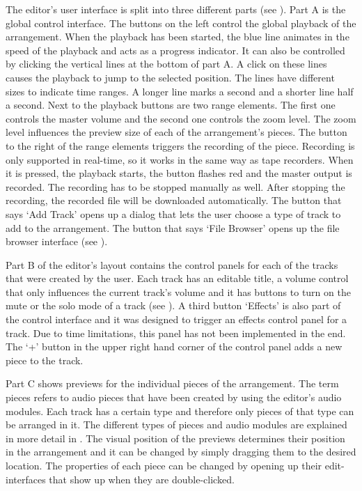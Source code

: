 The editor's user interface is split into three different parts (see ). Part A is the global control interface. The buttons on the left control the global playback of the arrangement. When the playback has been started, the blue line animates in the speed of the playback and acts as a progress indicator. It can also be controlled by clicking the vertical lines at the bottom of part A. A click on these lines causes the playback to jump to the selected position. The lines have different sizes to indicate time ranges. A longer line marks a second and a shorter line half a second. Next to the playback buttons are two range elements. The first one controls the master volume and the second one controls the zoom level. The zoom level influences the preview size of each of the arrangement's pieces. The button to the right of the range elements triggers the recording of the piece. Recording is only supported in real-time, so it works in the same way as tape recorders. When it is pressed, the playback starts, the button flashes red and the master output is recorded. The recording has to be stopped manually as well. After stopping the recording, the recorded file will be downloaded automatically. The button that says `Add Track' opens up a dialog that lets the user choose a type of track to add to the arrangement. The button that says `File Browser' opens up the file browser interface (see ).

Part B of the editor's layout contains the control panels for each of the tracks that were created by the user. Each track has an editable title, a volume control that only influences the current track's volume and it has buttons to turn on the mute or the solo mode of a track (see ). A third button `Effects' is also part of the control interface and it was designed to trigger an effects control panel for a track. Due to time limitations, this panel has not been implemented in the end. The `+' button in the upper right hand corner of the control panel adds a new piece to the track.

Part C shows previews for the individual pieces of the arrangement. The term pieces refers to audio pieces that have been created by using the editor's audio modules. Each track has a certain type and therefore only pieces of that type can be arranged in it. The different types of pieces and audio modules are explained in more detail in . The visual position of the previews determines their position in the arrangement and it can be changed by simply dragging them to the desired location. The properties of each piece can be changed by opening up their edit-interfaces that show up when they are double-clicked.

